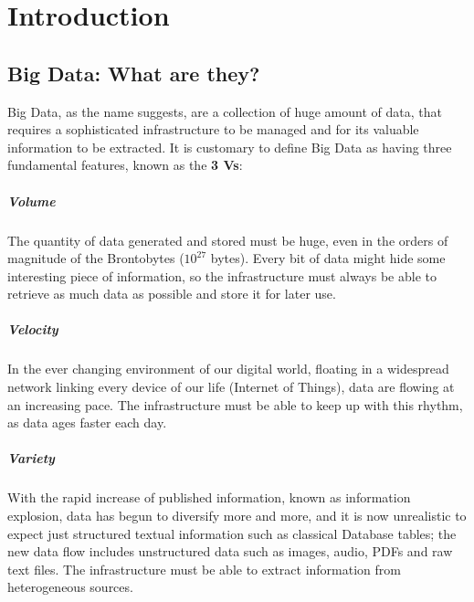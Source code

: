 \chapter{Introduction}

\section{Big Data: What are they?}

Big Data, as the name suggests, are a collection of huge amount of data, that requires a sophisticated infrastructure to be managed and for its valuable information to be extracted.\newline
It is customary to define Big Data as having three fundamental features, known as the \textbf{3 Vs}:

\paragraph{Volume}

The quantity of data generated and stored must be huge, even in the orders of magnitude of the Brontobytes ($10^{27}$ bytes).
Every bit of data might hide some interesting piece of information, so the infrastructure must always be able to retrieve as much data as possible and store it for later use.

\paragraph{Velocity}

In the ever changing environment of our digital world, floating in a widespread network linking every device of our life (Internet of Things), data are flowing at an increasing pace. The infrastructure must be able to keep up with this rhythm, as data ages faster each day.

\paragraph{Variety}

With the rapid increase of published information, known as information explosion, data has begun to diversify more and more, and it is now unrealistic to expect just structured textual information such as classical Database tables; the new data flow includes unstructured data such as images, audio, PDFs and raw text files. The infrastructure must be able to extract information from heterogeneous sources.


